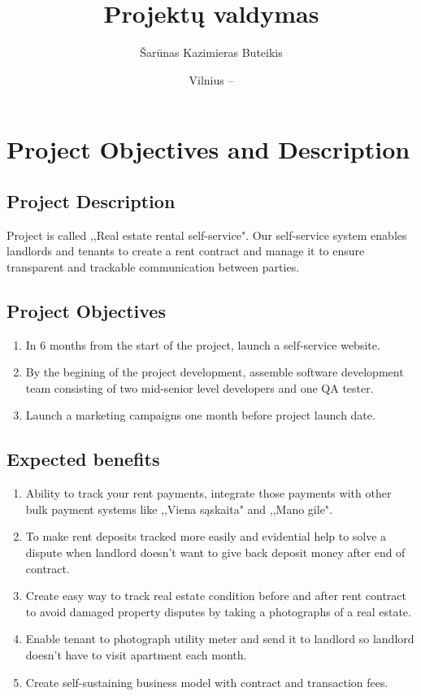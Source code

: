\documentclass{VUMIFPSkursinis}
\title{Projektų valdymas}
\author{Šarūnas Kazimieras Buteikis}
\date{Vilnius – \the\year}
\begin{document}
\maketitle

\tableofcontents

\section{Project Objectives and Description}
	\subsection{Project Description}
		Project is called ,,Real estate rental self-service". 
		Our self-service system enables landlords and tenants to create a rent contract and manage it to ensure transparent and trackable communication between parties.

	\subsection{Project Objectives}
		\begin{enumerate}
			\item{In 6 months from the start of the project, launch a self-service website.}
			\item{By the begining of the project development, assemble software development team consisting of two mid-senior level developers and one QA tester.}
			\item{Launch a marketing campaigns one month before project launch date.}
		\end{enumerate}

	\subsection{Expected benefits}
		\begin{enumerate}
			\item{Ability to track your rent payments, integrate those payments with other bulk payment systems like ,,Viena sąskaita" and ,,Mano gile".}
			\item{To make rent deposits tracked more easily and evidential help to solve a dispute when landlord doesn't want to give back deposit money after end of contract.}
			\item{Create easy way to track real estate condition before and after rent contract to avoid damaged property disputes by taking a photographs of a real estate.}
			\item{Enable tenant to photograph utility meter and send it to landlord so landlord doesn't have to visit apartment each month.}
			\item{Create self-sustaining business model with contract and transaction fees.}
		\end{enumerate}
\end{document}
